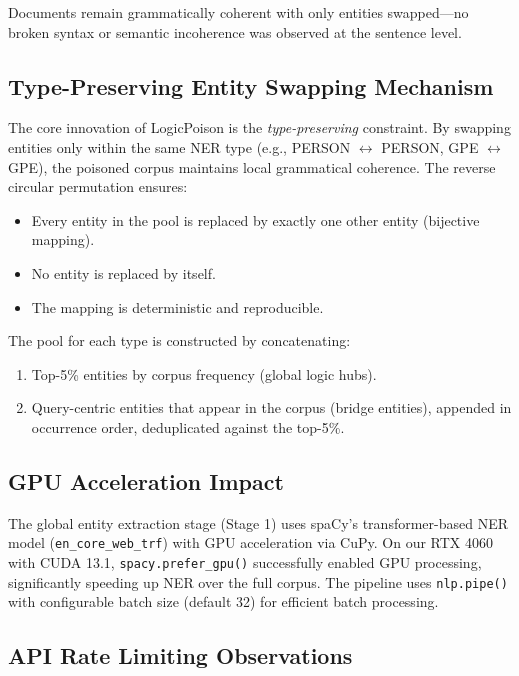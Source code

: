 \documentclass[11pt,a4paper]{article}
\begin{document}
Documents remain grammatically coherent with only entities swapped---no broken
syntax or semantic incoherence was observed at the sentence level.

\subsection{Type-Preserving Entity Swapping Mechanism}

The core innovation of LogicPoison is the \emph{type-preserving} constraint.
By swapping entities only within the same NER type (e.g., PERSON $\leftrightarrow$
PERSON, GPE $\leftrightarrow$ GPE), the poisoned corpus maintains local
grammatical coherence.  The reverse circular permutation ensures:
\begin{itemize}[nosep]
  \item Every entity in the pool is replaced by exactly one other entity
        (bijective mapping).
  \item No entity is replaced by itself.
  \item The mapping is deterministic and reproducible.
\end{itemize}

The pool for each type is constructed by concatenating:
\begin{enumerate}
  \item Top-5\% entities by corpus frequency (global logic hubs).
  \item Query-centric entities that appear in the corpus (bridge entities),
        appended in occurrence order, deduplicated against the top-5\%.
\end{enumerate}

\subsection{GPU Acceleration Impact}

The global entity extraction stage (Stage 1) uses spaCy's transformer-based
NER model (\texttt{en\_core\_web\_trf}) with GPU acceleration via CuPy.
On our RTX 4060 with CUDA 13.1, \texttt{spacy.prefer\_gpu()} successfully
enabled GPU processing, significantly speeding up NER over the full corpus.
The pipeline uses \texttt{nlp.pipe()} with configurable batch size (default 32)
for efficient batch processing.

\subsection{API Rate Limiting Observations}
\end{document}
